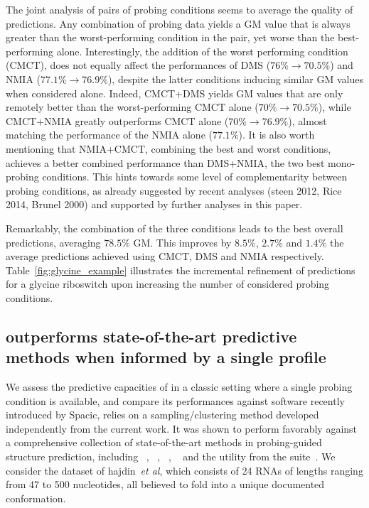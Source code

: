 \documentclass[a4,center,fleqn]{NAR}
\begin{document}
The joint analysis of pairs of probing conditions seems to average the quality of predictions. Any combination of probing data yields a GM value that is always greater than the worst-performing condition in the pair, yet worse than the best-performing alone. Interestingly, the addition of the worst performing condition (CMCT), does not equally affect the performances of DMS ($76\% \to 70.5\%$) %
and NMIA  ($77.1\% \to 76.9\%$), %
despite the latter conditions inducing similar GM values when considered alone. Indeed, CMCT+DMS yields GM values that are only remotely better than the worst-performing CMCT alone  ($70\% \to 70.5\%$), while CMCT+NMIA greatly outperforms CMCT alone  ($70\% \to 76.9\%$), almost matching the performance of the NMIA alone ($77.1\%$). It is also worth mentioning that NMIA+CMCT, combining the best and worst conditions, achieves a better combined performance than DMS+NMIA, the two best mono-probing conditions. This hints towards some level of complementarity between probing conditions, as already suggested by recent analyses \citep{Yu2018} (steen 2012, Rice 2014, Brunel 2000) and supported by further analyses in this paper.

Remarkably, the combination of the three conditions leads to the best overall predictions, averaging $78.5\%$ GM.
This improves by $8.5\%$, $2.7\%$ and $1.4\%$ the average predictions achieved using CMCT, DMS and NMIA respectively.
Table~\ref{fig:glycine_example} illustrates the incremental refinement of \OurTool predictions for a glycine riboswitch upon increasing the number of considered probing conditions.
 







\subsection*{\OurTool outperforms state-of-the-art predictive methods when informed by a single profile}
We assess the predictive capacities of \OurTool in a classic setting where a single probing condition is available, and compare its performances against  software recently introduced by Spacic\etal\cite{Spasic2017},  relies on a sampling/clustering method developed independently from the current work. It was shown to perform favorably against a comprehensive collection of state-of-the-art methods in probing-guided structure prediction, including ~\citep{Wu2015}, ~\citep{Deng2016}, ~\citep{Washietl2012}, ~\citep{Zarringhalam2012} and the  utility from the  suite~\citep{Reuter2010}.
We consider the dataset of hajdin~\emph{et al}, which consists of 24 RNAs of lengths ranging from 47 to 500 nucleotides, all believed to fold into a unique documented conformation. 
\end{document}
